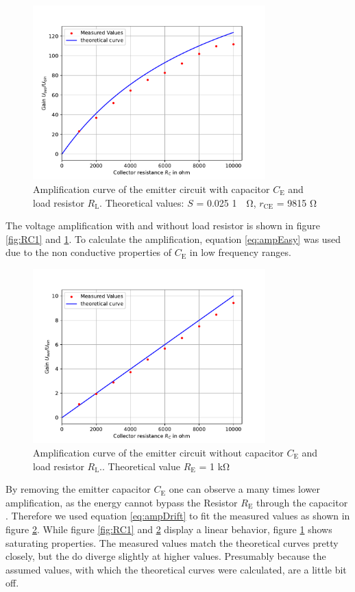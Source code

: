 \documentclass[11pt, a4paper]{article}
\begin{document}
\begin{figure}[h]
    \centering
    \includegraphics[width=0.8\textwidth]{plots/RC3.pdf}
    \caption{Amplification curve of the emitter circuit with capacitor $C_{\text{E}}$ and load resistor $R_{\text{L}}$. Theoretical values: $S$ = 0.025 \si{1 \per \ohm}, $r_{\text{CE}}$ = 9815 \si{\ohm}}
    \label{fig:RC3}
\end{figure}
The voltage amplification with and without load resistor is shown in figure \ref{fig:RC1} and \ref{fig:RC3}. To calculate the amplification, equation \ref{eq:ampEasy} was used due to the non conductive properties of $C_{\text{E}}$ in low frequency ranges.
\begin{figure}[h]
    \centering
    \includegraphics[width=0.8\textwidth]{plots/RC2.pdf}
    \caption{Amplification curve of the emitter circuit without capacitor $C_{\text{E}}$ and load resistor $R_{\text{L}}.$. Theoretical value $R_{\text{E}}$ = 1 \si{\kilo\ohm}}
    \label{fig:RC2}
\end{figure}
By removing the emitter capacitor $C_{\text{E}}$ one can observe a many times lower amplification, as the energy cannot bypass the Resistor $R_{\text{E}}$ through the capacitor . Therefore we used equation \ref{eq:ampDrift} to fit the measured values as shown in figure \ref{fig:RC2}.
While figure \ref{fig:RC1} and \ref{fig:RC2} display a linear behavior, figure \ref{fig:RC3} shows saturating properties.
The measured values match the theoretical curves pretty closely, but the do diverge slightly at higher values. Presumably because the assumed values, with which the theoretical curves were calculated, are a little bit off.
\end{document}
